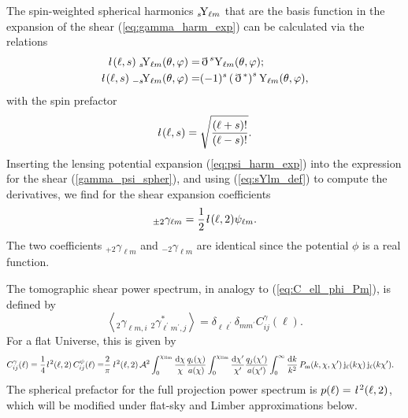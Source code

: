 \documentclass[fleqn,usenatbib]{mnras} %
\newcommand{\ellbar}{\hbox{\it \l}\,}
\newcommand{\pref}{{\cal A}}
\newcommand{\edth}{\,\eth\,}
\begin{document}
%
The spin-weighted spherical harmonics $_s\!{\rm Y}_{\ell m}$ that are the basis function
in the expansion of the shear (\ref{eq:gamma_harm_exp}) can be calculated via the relations
%
%
\begin{align}
  \ellbar(\ell, s) \; _s\!{\rm Y}_{\ell m}(\theta, \varphi) = & \edth^s {\rm Y}_{\ell m}(\theta, \varphi);
    \nonumber \\
  \ellbar(\ell, s) \; _{-s}\!{\rm Y}_{\ell m}(\theta, \varphi) = & (-1)^s \left(\edth^\ast\right)^s {\rm Y}_{\ell m}(\theta, \varphi),
  \label{eq:sYlm_def} 
\end{align}
%
with the spin prefactor \citep{2012PhRvD..86b3001B}
%
\begin{equation}
  \ellbar(\ell, s) = \sqrt{\frac{(\ell + s)!}{(\ell - s)!}}.
\end{equation} 
%
Inserting the lensing potential expansion (\ref{eq:psi_harm_exp}) into the
expression for the shear (\ref{gamma_psi_spher}), and using (\ref{eq:sYlm_def})
to compute the derivatives, we find for the shear expansion coefficients
\citep{2000PhRvD..62d3007H,2001astro.ph.11605T}
%
%
\begin{equation}
  _{\pm 2} \gamma_{\ell m} = \frac 1 2 \ellbar(\ell, 2) \psi_{\ell m}.
  \label{eq:gamma_ellm_phi_ellm}
\end{equation}
%
The two coefficients $_{+2} \gamma_{\ell m}$ and $_{-2} \gamma_{\ell m}$ are
identical since the potential $\phi$ is a real function.

The tomographic shear power spectrum, in analogy to (\ref{eq:C_ell_phi_Pm}), is defined by
%
\begin{equation}
  \left\langle _2\gamma^{}_{\ell m, i} \; {}_2\gamma^\ast_{\ell^\prime m^\prime, j} \right\rangle
    = \delta_{\ell \ell^\prime} \delta_{m m^\prime} C^\gamma_{ij}(\ell).
  \label{eq:C_ell_gamma}
\end{equation}
%
For a flat Universe, this is given by
%
\begin{align}
  C^\gamma_{ij}(\ell) = \frac 1 4 \ellbar^2(\ell, 2) \, C^\psi_{ij}(\ell)
                 = & \frac 2 \pi \, \ellbar^2(\ell, 2) \, \pref^2
                 \int_{0}^{\chi_{\rm lim}} \frac{\rm d \chi}{\chi} \frac{q_i(\chi)}{a(\chi)}
                \int_{0}^{\chi_{\rm lim}} \frac{\rm d \chi^\prime}{\chi^\prime}
                \frac{q_j(\chi^\prime)}{a(\chi^\prime)}
                \int_0^\infty \frac{{\rm d} k}{k^2} \, P_{\rm m}(k, \chi, \chi^\prime) \,
                {\rm j}_\ell(k \chi) \, {\rm j}_\ell(k \chi^\prime) .
  \label{eq:C_ell_full}
\end{align}
%
The spherical prefactor for the full projection power spectrum is $p(\ell) =
\ellbar^2(\ell, 2)$, which will be modified under flat-sky and Limber
approximations below.
\end{document}
